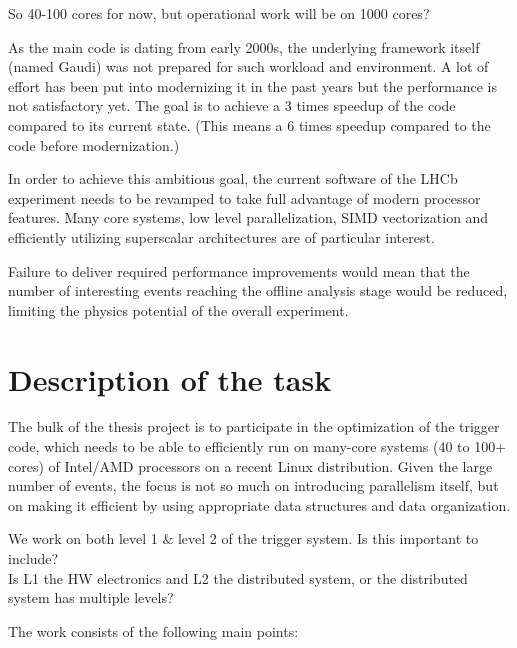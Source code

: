 \documentclass[12pt]{article}
\begin{document}
	\color{blue}
	So 40-100 cores for now, but operational work will be on 1000 cores?
	\color{black}
	
	
	\vspace{0.7pc}	
	As the main code is dating from early 2000s, the underlying framework itself (named Gaudi) was not prepared for such workload and environment. A lot of effort has been put into modernizing it in the past years but the performance is not satisfactory yet. The goal is to achieve a 3 times speedup of the code compared to its current state. (This means a 6 times speedup compared to the code before modernization.)
	
	\vspace{0.7pc}
	In order to achieve this ambitious goal, the current software of the LHCb experiment needs to be revamped to take full advantage of modern processor features. Many core systems, low level parallelization, SIMD vectorization and efficiently utilizing superscalar architectures are of particular interest.
	
	
	\vspace{0.7pc}
	Failure to deliver required performance improvements would mean that the number of interesting events reaching the offline analysis stage would be reduced, limiting the physics potential of the overall experiment.	
	
	
	\newpage
	\section{Description of the task}
	
	The bulk of the thesis project is to participate in the optimization of the trigger code, which needs to be able to efficiently run on many-core systems (40 to 100+ cores) of Intel/AMD processors on a recent Linux distribution. Given the large number of events, the focus is not so much on introducing parallelism itself, but on making it efficient by using appropriate data structures and data organization.
	
	\color{blue}
	We work on both level 1 \& level 2 of the trigger system. Is this important to include? \\
	Is L1 the HW electronics and L2 the distributed system, or the distributed system has multiple levels?
	\color{black}
	
	\vspace{1pc}
	The work consists of the following main points:
	
\end{document}
